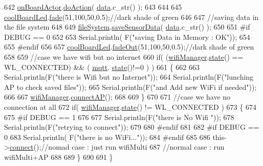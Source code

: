 \begin{DoxyCode}
642     \hyperlink{class_cool_board_a4ac693895c21025b8808653f2a4316e6}{onBoardActor}.\hyperlink{class_cool_board_actor_a96a45658d32c6b95caa2f385c7da32cd}{doAction}( \hyperlink{class_cool_board_a427fb753dd8575bdf821c70a5c63d695}{data}.c\_str() );  
643 
644 
645     \hyperlink{class_cool_board_a1b1d3c684a5baa56b08486e192fd8e97}{coolBoardLed}.\hyperlink{class_cool_board_led_af1cacbaa88db8bcf6042c1083ba41155}{fade}(51,100,50,0.5);\textcolor{comment}{//dark shade of green  }
646     
647     \textcolor{comment}{//saving data in the file system}
648     
649     \hyperlink{class_cool_board_a42c2586fbb13ff7f06538e9284e8538d}{fileSystem}.\hyperlink{class_cool_file_system_afa3a4feae94871d4d3b6bebb701c2e67}{saveSensorData}( \hyperlink{class_cool_board_a427fb753dd8575bdf821c70a5c63d695}{data}.c\_str() );
650 
651 \textcolor{preprocessor}{    #if DEBUG == 0}
652 
653         Serial.println( F(\textcolor{stringliteral}{"saving Data in Memory : OK"}));
654 
655 \textcolor{preprocessor}{    #endif}
656 
657     \hyperlink{class_cool_board_a1b1d3c684a5baa56b08486e192fd8e97}{coolBoardLed}.\hyperlink{class_cool_board_led_a93d545679237e8cc858324367149775c}{fadeOut}(51,100,50,0.5);\textcolor{comment}{//dark shade of green}
658 
659     \textcolor{comment}{//case we have wifi but no internet}
660     \textcolor{keywordflow}{if}( (\hyperlink{class_cool_board_acd88e6003606b47479ebba81e4aceeca}{wifiManager}.\hyperlink{class_cool_wifi_a1c7b4d82a4098d346e7593dce92039fa}{state}() == WL\_CONNECTED) && ( \hyperlink{class_cool_board_a2399f44d7c23c1149a335cb3b46d90f1}{mqtt}.
      \hyperlink{class_cool_m_q_t_t_a5d003307eff78efbd585e42b43b72b6d}{state}()!=0 ) )
661     \{
662         
663         Serial.println(F(\textcolor{stringliteral}{"there is Wifi but no Internet"}));
664         Serial.println(F(\textcolor{stringliteral}{"lunching AP to check saved files"}));
665         Serial.println(F(\textcolor{stringliteral}{"and Add new WiFi if needed"}));
666         
667         \hyperlink{class_cool_board_acd88e6003606b47479ebba81e4aceeca}{wifiManager}.\hyperlink{class_cool_wifi_a7c857f27161782f5ef1d62d552aff971}{connectAP}();
668         
669     \}
670     
671     \textcolor{comment}{//case we have no connection at all}
672     \textcolor{keywordflow}{if}( \hyperlink{class_cool_board_acd88e6003606b47479ebba81e4aceeca}{wifiManager}.\hyperlink{class_cool_wifi_a1c7b4d82a4098d346e7593dce92039fa}{state}() != WL\_CONNECTED )
673     \{
674     
675 \textcolor{preprocessor}{    #if DEBUG == 1}
676         
677         Serial.println(F(\textcolor{stringliteral}{"there is No Wifi "}));
678         Serial.println(F(\textcolor{stringliteral}{"retrying to connect"}));
679     
680 \textcolor{preprocessor}{    #endif}
681 
682 \textcolor{preprocessor}{    #if DEBUG == 0}
683         Serial.println( F(\textcolor{stringliteral}{"there is no WiFi..."}));
684 \textcolor{preprocessor}{    #endif}
685         
686         this->\hyperlink{class_cool_board_a519de78b807f8ec6463ff484eb925918}{connect}();\textcolor{comment}{//nomad case : just run wifiMulti}
687                 \textcolor{comment}{//normal case : run wifiMulti+AP}
688         
689     \}   
690 
691 \}
\end{DoxyCode}
